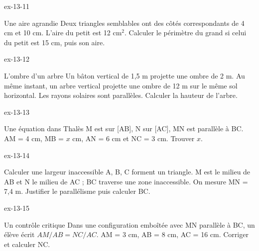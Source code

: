 \clearpage{}
\begin{blocLivre}{ex-13-11}\begin{exercice}[3]{Une aire agrandie}
Deux triangles semblables ont des côtés correspondants de 4 cm et 10 cm. L’aire du petit est 12 cm$^2$. Calculer le périmètre du grand si celui du petit est 15 cm, puis son aire.
\label{fig-ex-13-11}
\end{exercice}\end{blocLivre}
\begin{blocLivre}{ex-13-12}\begin{exercice}[3]{L’ombre d’un arbre}
Un bâton vertical de 1,5 m projette une ombre de 2 m. Au même instant, un arbre vertical projette une ombre de 12 m sur le même sol horizontal. Les rayons solaires sont parallèles. Calculer la hauteur de l’arbre.
\label{fig-ex-13-12}
\end{exercice}\end{blocLivre}
\begin{blocLivre}{ex-13-13}\begin{exercice}[3]{Une équation dans Thalès}
M est sur [AB], N sur [AC], MN est parallèle à BC. AM = 4 cm, MB = $x$ cm, AN = 6 cm et NC = 3 cm. Trouver $x$.
\label{fig-ex-13-13}
\end{exercice}\end{blocLivre}
\begin{blocLivre}{ex-13-14}\begin{exercice}[3]{Calculer une largeur inaccessible}
A, B, C forment un triangle. M est le milieu de AB et N le milieu de AC ; BC traverse une zone inaccessible. On mesure MN = 7,4 m. Justifier le parallélisme puis calculer BC.
\label{fig-ex-13-14}
\end{exercice}\end{blocLivre}
\begin{blocLivre}{ex-13-15}\begin{exercice}[3]{Un contrôle critique}
Dans une configuration emboîtée avec MN parallèle à BC, un élève écrit $AM/AB=NC/AC$. AM = 3 cm, AB = 8 cm, AC = 16 cm. Corriger et calculer NC.
\label{fig-ex-13-15}
\end{exercice}\end{blocLivre}

\clearpage
